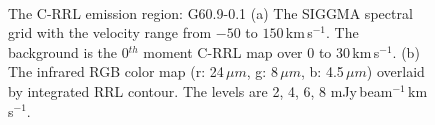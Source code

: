 \documentclass[manuscript]{aastex61}
\newcommand{\kms}{\,km\,s$^{-1}$}
\newcommand{\um}{\mu m}
\begin{document}
\begin{figure}[H]
\centering
{}
\\ 
\caption{The C-RRL emission region: G60.9-0.1
          (a) The SIGGMA spectral grid with the velocity range from $-50$ to $150$\kms.
	  The background is the 0$^{th}$ moment C-RRL map over $0$ to $30$\kms.
	  (b) The infrared RGB color map (r: 24\,$\um$, g: 8\,$\um$, b: 4.5\,$\um$) overlaid by integrated RRL contour.
	  The levels are 2, 4, 6, 8 mJy\,beam$^{-1}$\kms.}
\label{fig_crrl-g609}
\end{figure}
\end{document}
